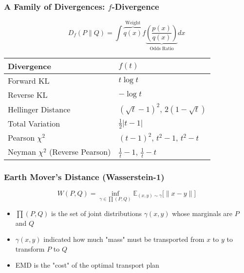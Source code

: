 \documentclass{beamer}
\begin{document}
\begin{frame}
  \frametitle{A Family of Divergences: $f$-Divergence}
  \begin{equation*}
    D_{f}(P \parallel Q) = \int \overbrace{q(x)}^{\text{Weight}} f \underbrace{\left( \frac{p(x)}{q(x)} \right)}_{\text{Odds Ratio}} dx
  \end{equation*}
  \begin{center}
  \begin{tabular}{C{5cm}|C{5cm}}
  \toprule
  {Divergence} & $f(t)$ \\
  \midrule
  Forward KL   &  $t \log t$ \\
  Reverse KL   &  $- \log t$ \\
  Hellinger Distance  &  $\left(\sqrt{t} - 1 \right)^2$, $2 \left( 1 - \sqrt{t} \right)$ \\
  Total Variation & $\frac{1}{2} \vert t - 1 \vert$ \\
  Pearson $\chi^2$ & $\left( t-1 \right)^2$, $t^2 - 1$, $t^2 - t$ \\
  Neyman $\chi^2$ (Reverse Pearson) & $\frac{1}{t} - 1$, $\frac{1}{t} - t$ \\
  \bottomrule
  \end{tabular}
  \end{center}
\end{frame}


\begin{frame}
  \frametitle{Earth Mover's Distance (Wasserstein-1)}
  \begin{equation*}
    W\left(P, Q\right) = \inf_{\gamma \in \prod (P, Q)} \mathbb{E}_{(x, y) \sim \gamma} \big[ \parallel x - y \parallel \big]
  \end{equation*}
  \begin{itemize}
    \item $\prod (P, Q)$ is the set of joint distributions $\gamma(x, y)$ whose marginals are $P$ and $Q$
    \item $\gamma(x, y)$ indicated how much "mass" must be transported from $x$ to $y$ to transform $P$ to $Q$
    \item EMD is the "cost" of the optimal transport plan
  \end{itemize}
\end{frame}
\end{document}
